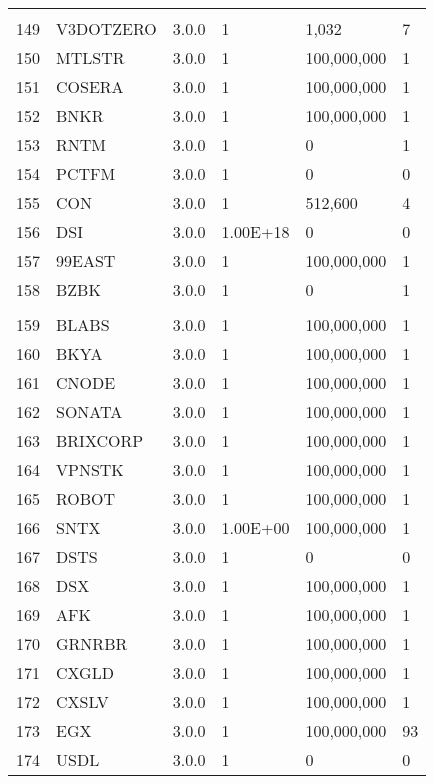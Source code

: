 \begin{longtable}{llllll}
 &  &  &  &  &  \\
149 & V3DOTZERO & 3.0.0 & 1 & 1,032 & 7 \\
150 & MTLSTR & 3.0.0 & 1 & 100,000,000 & 1 \\
151 & COSERA & 3.0.0 & 1 & 100,000,000 & 1 \\
152 & BNKR & 3.0.0 & 1 & 100,000,000 & 1 \\
153 & RNTM & 3.0.0 & 1 & 0 & 1 \\
154 & PCTFM & 3.0.0 & 1 & 0 & 0 \\
155 & CON & 3.0.0 & 1 & 512,600 & 4 \\
156 & DSI & 3.0.0 & 1.00E+18 & 0 & 0 \\
157 & 99EAST & 3.0.0 & 1 & 100,000,000 & 1 \\
158 & BZBK & 3.0.0 & 1 & 0 & 1 \\ 
 &  &  &  &  &  \\
159 & BLABS & 3.0.0 & 1 & 100,000,000 & 1 \\
160 & BKYA & 3.0.0 & 1 & 100,000,000 & 1 \\
161 & CNODE & 3.0.0 & 1 & 100,000,000 & 1 \\
162 & SONATA & 3.0.0 & 1 & 100,000,000 & 1 \\
163 & BRIXCORP & 3.0.0 & 1 & 100,000,000 & 1 \\
164 & VPNSTK & 3.0.0 & 1 & 100,000,000 & 1 \\
165 & ROBOT & 3.0.0 & 1 & 100,000,000 & 1 \\
166 & SNTX & 3.0.0 & 1.00E+00 & 100,000,000 & 1 \\
167 & DSTS & 3.0.0 & 1 & 0 & 0 \\
168 & DSX & 3.0.0 & 1 & 100,000,000 & 1 \\
169 & AFK & 3.0.0 & 1 & 100,000,000 & 1 \\
170 & GRNRBR & 3.0.0 & 1 & 100,000,000 & 1 \\
171 & CXGLD & 3.0.0 & 1 & 100,000,000 & 1 \\
172 & CXSLV & 3.0.0 & 1 & 100,000,000 & 1 \\
173 & EGX & 3.0.0 & 1 & 100,000,000 & 93 \\
174 & USDL & 3.0.0 & 1 & 0 & 0 \\ \hline
\end{longtable}